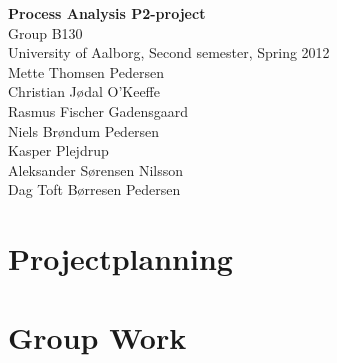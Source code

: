 

\mainmatter
\begin{center}
\textbf{\HUGE Process Analysis P2-project}\\
{\Large Group B130}\\
University of Aalborg, Second semester, Spring 2012\\


Mette Thomsen Pedersen\\
Christian Jødal O'Keeffe\\
Rasmus Fischer Gadensgaard\\
Niels Brøndum Pedersen\\
Kasper Plejdrup\\
Aleksander Sørensen Nilsson\\
Dag Toft Børresen Pedersen\\
\end{center}
\newpage


\setlength\parskip{0ex} %
\tableofcontents* %
\setlength{\parskip}{3mm} %



\pagestyle{custom}



\chapter{Projectplanning}
 

\chapter{Group Work}
%
%



